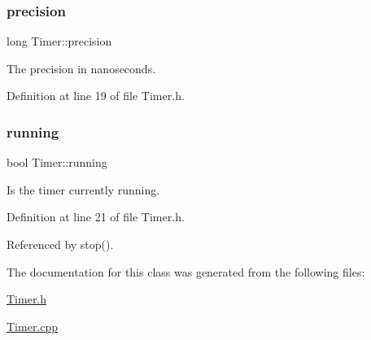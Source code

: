 \subsubsection{\texorpdfstring{precision}{precision}}
{\footnotesize\ttfamily long Timer\+::precision\hspace{0.3cm}{\ttfamily [private]}}



The precision in nanoseconds. 



Definition at line 19 of file Timer.\+h.

\mbox{\label{class_timer_a3b8bb57a0a252c88f85c0592715ea425}} 
\subsubsection{\texorpdfstring{running}{running}}
{\footnotesize\ttfamily bool Timer\+::running\hspace{0.3cm}{\ttfamily [private]}}



Is the timer currently running. 



Definition at line 21 of file Timer.\+h.



Referenced by stop().



The documentation for this class was generated from the following files\+:\begin{DoxyCompactItemize}
\item 
\hyperlink{_timer_8h}{Timer.\+h}\item 
\hyperlink{_timer_8cpp}{Timer.\+cpp}\end{DoxyCompactItemize}
